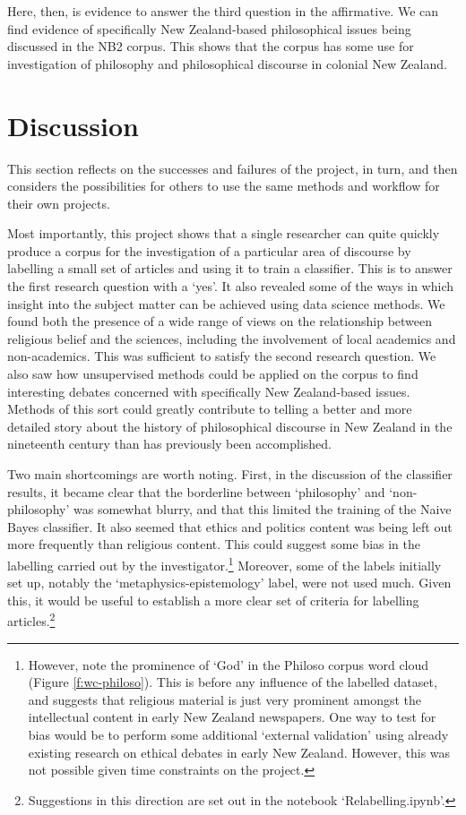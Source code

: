 \documentclass{article}
\begin{document}
Here, then, is evidence to answer the third question in the affirmative. We can find evidence of specifically New Zealand-based philosophical issues being discussed in the NB2 corpus. This shows that the corpus has some use for investigation of philosophy and philosophical discourse in colonial New Zealand.

\section{Discussion}\label{s:discussion}

This section reflects on the successes and failures of the project, in turn, and then considers the possibilities for others to use the same methods and workflow for their own projects.

Most importantly, this project shows that a single researcher can quite quickly produce a corpus for the investigation of a particular area of discourse by labelling a small set of articles and using it to train a classifier. This is to answer the first research question with a `yes'. It also revealed some of the ways in which insight into the subject matter can be achieved using data science methods. We found both the presence of a wide range of views on the relationship between religious belief and the sciences, including the involvement of local academics and non-academics. This was sufficient to satisfy the second research question. We also saw how unsupervised methods could be applied on the corpus to find interesting debates concerned with specifically New Zealand-based issues. Methods of this sort could greatly contribute to telling a better and more detailed story about the history of philosophical discourse in New Zealand in the nineteenth century than has previously been accomplished.

Two main shortcomings are worth noting. First, in the discussion of the classifier results, it became clear that the borderline between `philosophy' and `non-philosophy' was somewhat blurry, and that this limited the training of the Naive Bayes classifier. It also seemed that ethics and politics content was being left out more frequently than religious content. This could suggest some bias in the labelling carried out by the investigator.\footnote{However, note the prominence of `God' in the Philoso corpus word cloud (Figure \ref{f:wc-philoso}). This is before any influence of the labelled dataset, and suggests that religious material is just very prominent amongst the intellectual content in early New Zealand newspapers. One way to test for bias would be to perform some additional `external validation' using already existing research on ethical debates in early New Zealand. However, this was not possible given time constraints on the project.}
Moreover, some of the labels initially set up, notably the `metaphysics-epistemology' label, were not used much. Given this, it would be useful to establish a more clear set of criteria for labelling articles.\footnote{Suggestions in this direction are set out in the notebook `Relabelling.ipynb'.}
\end{document}
